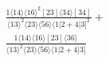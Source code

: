 \documentclass[varwidth, border=5pt]{standalone}
\begin{document}
\begin{my}
$\begin{gathered}
\scriptscriptstyle\frac{1⟨14⟩⟨16⟩^2[23]⟨34⟩[34]}{⟨13⟩^2⟨23⟩⟨56⟩⟨1|2+4|3]^2}+\\
\scriptscriptstyle\frac{1⟨14⟩⟨16⟩[23]⟨36⟩}{⟨13⟩^2⟨23⟩⟨56⟩⟨1|2+4|3]}\phantom{+}
\end{gathered}$
\end{my}
\end{document}
